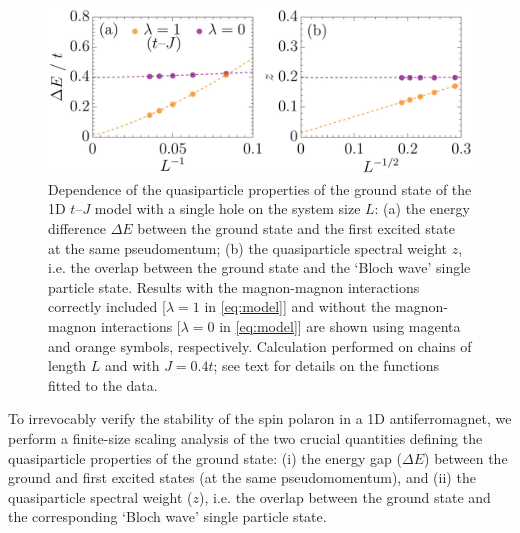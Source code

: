 \documentclass[%
 reprint,
 amsmath,amssymb,
 aps,
prl,
]{revtex4-1}
\begin{document}
\begin{figure}[t!]
    \includegraphics[width=\columnwidth]
    {fig_2.jpg}
  \caption{Dependence of the quasiparticle properties of the ground state of the 1D $t$--$J$ model with a single hole on the system size $L$: (a) the energy difference $\Delta E$ between the ground state and the first excited state at the same pseudomentum; (b) the quasiparticle spectral weight $z$, i.e. the overlap between the ground state and the `Bloch wave' single particle state. Results with the magnon-magnon interactions correctly included [$\lambda=1$ in \eqref{eq:model}] and without the magnon-magnon interactions [$\lambda=0$ in \eqref{eq:model}]
%
are shown using magenta and orange symbols, respectively.
Calculation performed on chains of length $L$ and with  $J = 0.4t$; see text for details on the functions fitted to the data.
}
\label{fig:scaling}
\end{figure}

To irrevocably verify the stability of the spin polaron in a 1D antiferromagnet, 
we perform a finite-size scaling analysis of the two crucial quantities defining the quasiparticle properties of the ground state: (i) the energy gap ($\Delta E$) between the ground and first excited states (at the same pseudomomentum), and (ii) the quasiparticle spectral weight ($z$), i.e. the overlap between the ground state and the corresponding `Bloch wave’ single particle state. 
\end{document}
